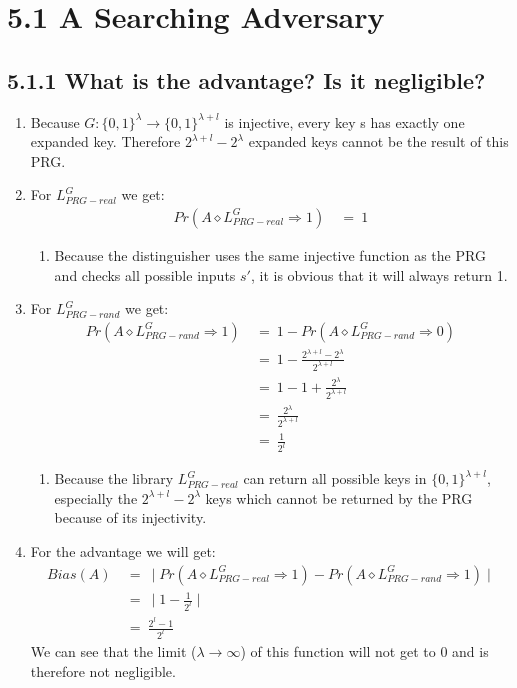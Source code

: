 \documentclass{report}
\begin{document}
	\pagestyle{fancy}
	
	\section*{5.1 A Searching Adversary}
	\subsection*{5.1.1 What is the advantage? Is it negligible?}
		\begin{enumerate}[]
			\item Because $G: \{ 0,1 \} ^{\lambda} \rightarrow \{ 0,1 \} ^{\lambda + l}$ is injective, every key s has exactly one expanded key. Therefore $2 ^{\lambda +l} - 2 ^{\lambda}$ expanded keys cannot be the result of this PRG.
			\item For $L_{PRG-real}^G$ we get:
			\begin{align*}
				Pr( A \diamond L_{PRG-real}^G \Rightarrow 1 ) \ & = \ 1
			\end{align*}
			\begin{enumerate}[]
				\item Because the distinguisher uses the same injective function as the PRG and checks all possible inputs $s'$, it is obvious that it will always return 1.
			\end{enumerate}
			\item For $L_{PRG-rand}^G$ we get:
			\begin{align*}
				Pr( A \diamond L_{PRG-rand}^G \Rightarrow 1 ) \ & = \ 1 - Pr( A \diamond L_{PRG-rand}^G \Rightarrow 0 ) \\
				& = \ 1 - \frac{2^{\lambda + l} - 2^{\lambda}}{2^{\lambda + l}} \\
				& = \ 1 - 1 + \frac{2^{\lambda}}{2^{\lambda + l}} \\
				& = \ \frac{2^{\lambda}}{2^{\lambda + l}} \\
				& = \ \frac{1}{2^l}
			\end{align*}
			\begin{enumerate}[]
				\item Because the library $L_{PRG-real}^G$ can return all possible keys in $\{ 0,1 \} ^{\lambda +l}$, especially the $2 ^{\lambda +l} - 2 ^{\lambda}$ keys which cannot be returned by the PRG because of its injectivity. 
			\end{enumerate}
			\item For the advantage we will get:
			\begin{align*}
				Bias(A) \ & = \ \mid Pr( A \diamond L_{PRG-real}^G \Rightarrow 1 ) - Pr( A \diamond L_{PRG-rand}^G \Rightarrow 1 ) \mid \\
				& = \ \mid 1 - \frac{1}{2^l} \mid \\
				& = \ \frac{2^l -1}{2^l}
			\end{align*}
			We can see that the limit ($\lambda \rightarrow \infty$) of this function will not get to 0 and is therefore not negligible.
		\end{enumerate}
\end{document}
